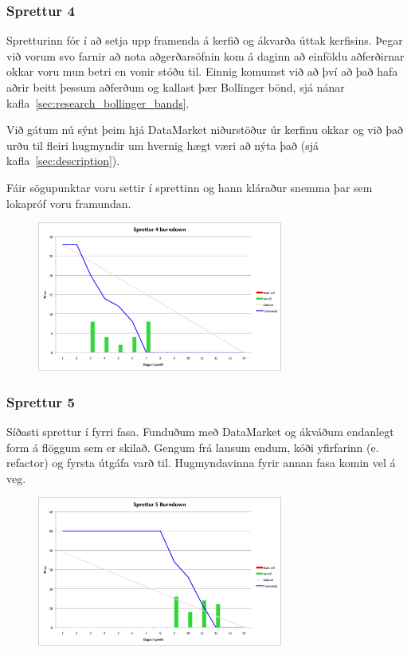 \documentclass{article}
\begin{document}
\subsubsection{Sprettur 4}
Spretturinn fór í að setja upp framenda á kerfið og ákvarða úttak kerfisins. 
Þegar við vorum svo farnir að nota aðgerðarsöfnin 
kom á daginn að einföldu aðferðirnar okkar voru mun betri en vonir stóðu til.
Einnig komumst við að því að það hafa aðrir beitt þessum aðferðum 
og kallast þær Bollinger bönd, sjá nánar kafla~\ref{sec:research_bollinger_bands}. 

Við gátum nú sýnt þeim hjá DataMarket niðurstöður úr kerfinu okkar og við það
urðu til fleiri hugmyndir um hvernig hægt væri að nýta það (sjá kafla~\ref{sec:description}).

Fáir sögupunktar voru settir í sprettinn og hann kláraður snemma þar sem lokapróf voru framundan.
\begin{figure}[H]
 \centering
 \includegraphics[width=0.72\textwidth]{Sprettur4_Burndown.png}
 \caption{}
\label{fig:sp4}
\end{figure}

\subsubsection{Sprettur 5}
Síðasti sprettur í fyrri fasa. Funduðum með DataMarket og ákváðum endanlegt form á
flöggum sem er skilað. Gengum frá lausum endum, kóði yfirfarinn 
(e. refactor) og fyrsta útgáfa varð til. Hugmyndavinna fyrir annan fasa komin vel á veg.

\begin{figure}[H]
 \centering
 \includegraphics[width=0.72\textwidth]{Sprettur5_Burndown.png}
 \caption{}
\label{fig:sp5}
\end{figure}
\end{document}
